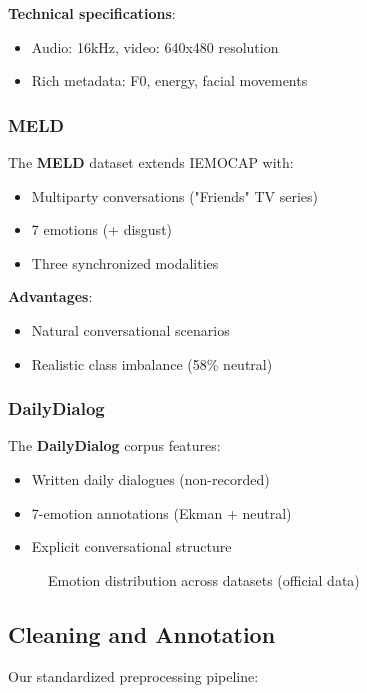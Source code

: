 \documentclass[a4paper,11pt]{article}
\begin{document}
\textbf{Technical specifications}:
\begin{itemize}
    \item Audio: 16kHz, video: 640x480 resolution
    \item Rich metadata: F0, energy, facial movements
\end{itemize}

\subsubsection{MELD}
The \textbf{MELD} dataset \cite{poria2019meld} extends IEMOCAP with:
\begin{itemize}
    \item Multiparty conversations ("Friends" TV series)
    \item 7 emotions (+ disgust)
    \item Three synchronized modalities
\end{itemize}

\textbf{Advantages}:
\begin{itemize}
    \item Natural conversational scenarios
    \item Realistic class imbalance (58\% neutral)
\end{itemize}

\subsubsection{DailyDialog}
The \textbf{DailyDialog} corpus \cite{li2017dailydialog} features:
\begin{itemize}
    \item Written daily dialogues (non-recorded)
    \item 7-emotion annotations (Ekman + neutral)
    \item Explicit conversational structure
\end{itemize}

\begin{figure}[ht]
\centering
\caption{Emotion distribution across datasets (official data)}
\label{fig:emo_dist}
\end{figure}

\subsection{Cleaning and Annotation}
Our standardized preprocessing pipeline:
\end{document}
